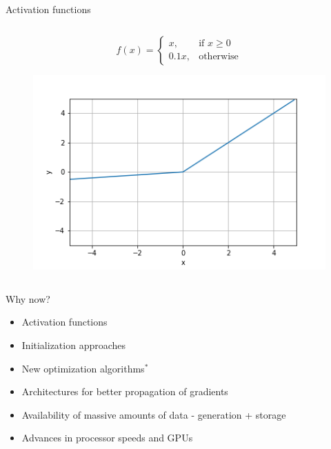 \begin{frame}{Activation functions}
\begin{columns}[T]
\begin{column}{.5\textwidth}
			\tiny{
				\[
				f(x)= 
				\begin{cases}
					x,& \text{if } x\geq 0\\
					0.1x,              & \text{otherwise}
				\end{cases}
				\]
			}
			\begin{figure}
				\includegraphics[width=.6\textwidth, center]{figuras/leaky_relu.png}	
			\end{figure}
		\end{column}
	\end{columns}
\end{frame}


\begin{frame}{Why now?}
\begin{itemize}
	\item Activation functions 
	\item Initialization approaches
	\item New optimization algorithms$^*$ 
	\item Architectures for better propagation of gradients 
	\item Availability of massive amounts of data - generation + storage 
	\item Advances in processor speeds and GPUs 
\end{itemize}
\end{frame}
